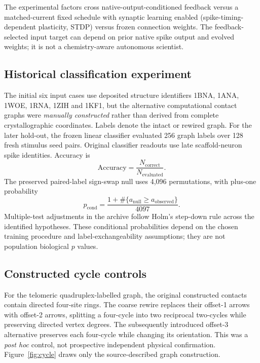 \documentclass[10pt,a4paper]{article}
\begin{document}
The experimental factors cross native-output-conditioned feedback versus a matched-current fixed schedule with synaptic learning enabled (spike-timing-dependent plasticity, STDP) versus frozen connection weights. The feedback-selected input target can depend on prior native spike output and evolved weights; it is not a chemistry-aware autonomous scientist.

\subsection{Historical classification experiment}
The initial six input cases use deposited structure identifiers 1BNA, 1ANA, 1WOE, 1RNA, 1ZIH and 1KF1, but the alternative computational contact graphs were \emph{manually constructed} rather than derived from complete crystallographic coordinates. Labels denote the intact or rewired graph. For the later hold-out, the frozen linear classifier evaluated 256 graph labels over 128 fresh stimulus seed pairs. Original classifier readouts use late scaffold-neuron spike identities. Accuracy is
\begin{equation}\mathrm{Accuracy}=\frac{N_{\mathrm{correct}}}{N_{\mathrm{evaluated}}}.\end{equation}
The preserved paired-label sign-swap null uses 4,096 permutations, with plus-one probability
\begin{equation}p_{\mathrm{cond}}=\frac{1+\#\{a_{\mathrm{null}}\geq a_{\mathrm{observed}}\}}{4097}.\end{equation}
Multiple-test adjustments in the archive follow Holm's step-down rule across the identified hypotheses. These conditional probabilities depend on the chosen training procedure and label-exchangeability assumptions; they are not population biological $p$ values.

\subsection{Constructed cycle controls}
For the telomeric quadruplex-labelled graph, the original constructed contacts contain directed four-site rings. The coarse rewire replaces their offset-1 arrows with offset-2 arrows, splitting a four-cycle into two reciprocal two-cycles while preserving directed vertex degrees. The subsequently introduced offset-3 alternative preserves each four-cycle while changing its orientation. This was a \emph{post hoc} control, not prospective independent physical confirmation. Figure~\ref{fig:cycle} draws only the source-described graph construction.
\end{document}
